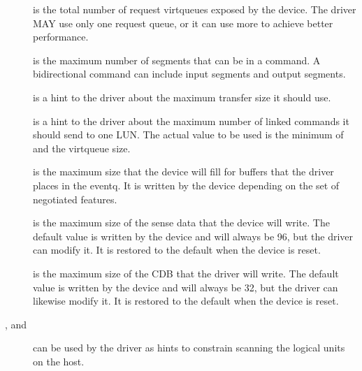 \begin{description}
\item[] is the total number of request virtqueues exposed by
    the device. The driver MAY use only one request queue,
    or it can use more to achieve better performance.

\item[] is the maximum number of segments that can be in a
    command. A bidirectional command can include  input
    segments and  output segments.

\item[] is a hint to the driver about the maximum transfer
    size it should use.

\item[] is a hint to the driver about the maximum number of
    linked commands it should send to one LUN. The actual value
    to be used is the minimum of  and the virtqueue
    size.

\item[] is the maximum size that the device will fill
    for buffers that the driver places in the eventq. It is
    written by the device depending on the set of negotiated
    features.

\item[] is the maximum size of the sense data that the
    device will write. The default value is written by the device
    and will always be 96, but the driver can modify it. It is
    restored to the default when the device is reset.

\item[] is the maximum size of the CDB that the driver will
    write. The default value is written by the device and will
    always be 32, but the driver can likewise modify it. It is
    restored to the default when the device is reset.

\item[,  and ] can be used by the driver
    as hints to constrain scanning the logical units on the
    host.
\end{description}


